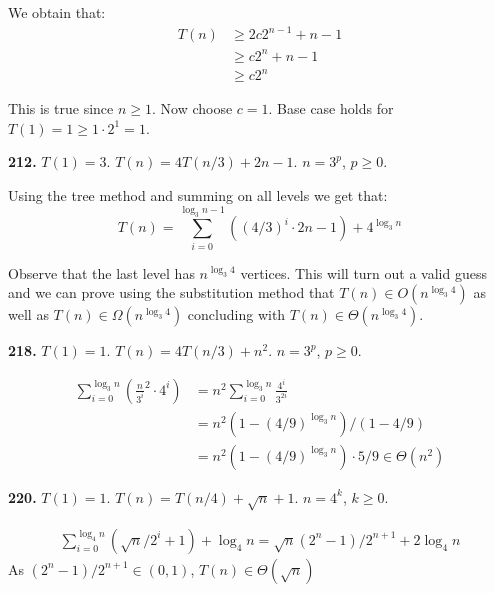 \documentclass{article}
\renewcommand{\geq}{\geqslant}
\begin{document}
We obtain that:
\begin{equation*}
\begin{split}
	T(n)
	 & \geq 2c2^{n-1}+n-1 \\
	 & \geq c2^{n} + n-1 \\
	 & \geq c2^{n}
\end{split}
\end{equation*}

This is true since $n \geq 1$. Now choose $c = 1$. Base case holds for $T(1) = 1 \geq 1 \cdot 2^{1} = 1$.

\noindent\textbf{212.} $T(1) = 3$. $T(n) = 4T(n/3) + 2n - 1$. $n = 3^p$, $p \geq 0$.

Using the tree method and summing on all levels we get that:
\begin{equation*}
	T(n) = \sum_{i = 0}^{\log_3 n - 1}((4/3)^i \cdot 2 n - 1) + 4^{\log_3 n}
\end{equation*}


Observe that the last level has $n^{\log_3 4}$ vertices. This will turn out a valid guess and we can prove using the substitution method that $T(n) \in O(n^{\log_3 4})$ as well as $T(n) \in \Omega(n^{\log_3 4})$ concluding with $T(n) \in \Theta(n^{\log_3 4})$.


\noindent\textbf{218.} $T(1) = 1$. $T(n) = 4T(n/3) + n^2$. $n = 3^p$, $p \geq 0$.

\begin{equation*}
\begin{split}
	\sum_{i = 0}^{\log_3 n}{(\frac{n}{3^i}^2 \cdot 4^i)} &= n^2 \sum_{i = 0}^{\log_3 n}{\frac{4^i}{3^{2i}}} \\
	&= n^2(1 - (4/9)^{\log_3 n}) / (1 - 4/9) \\
	&= n^2 (1 - (4/9)^{\log_3 n}) \cdot 5/9 \in \Theta(n^2)
\end{split}
\end{equation*}

\noindent\textbf{220.} $T(1) = 1$. $T(n) = T(n/4) + \sqrt{n} + 1$. $n = 4^k$, $k \geq 0$.

\begin{equation*}
\begin{split}
	\sum_{i=0}^{\log_4 n}(\sqrt n/2^i + 1) + \log_4 n= \sqrt n (2^n - 1) / 2^{n+1} + 2 \log_4 n
\end{split}
\end{equation*}
As $(2^n - 1) / 2^{n+1} \in (0, 1)$, $T(n) \in \Theta(\sqrt n)$
\end{document}
